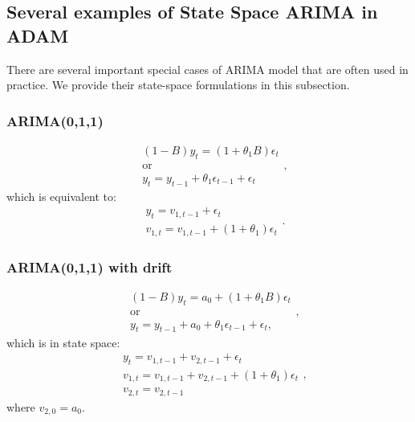\documentclass[]{book}
\theoremstyle{definition}
\theoremstyle{definition}
\theoremstyle{definition}
\theoremstyle{definition}
\theoremstyle{remark}
\begin{document}
\hypertarget{ADAMARIMAExamplesModels}{%
\subsection{Several examples of State Space ARIMA in ADAM}\label{ADAMARIMAExamplesModels}}

There are several important special cases of ARIMA model that are often used in practice. We provide their state-space formulations in this subsection.

\hypertarget{arima011}{%
\subsubsection{ARIMA(0,1,1)}\label{arima011}}

\begin{equation*}
    \begin{aligned}
        &(1-B) y_t = (1+\theta_1 B)\epsilon_t \\
        &\text{or} \\
        &y_{t} = y_{t-1} + \theta_1 \epsilon_{t-1} + \epsilon_t
    \end{aligned},
\end{equation*}
which is equivalent to:
\begin{equation}
  \begin{aligned}
    &{y}_{t} = v_{1,t-1} + \epsilon_t \\
    &v_{1,t} = v_{1,t-1} + (1 + \theta_1) \epsilon_{t}
  \end{aligned}.
  \label{eq:ADAMARIMAExpanded011}
\end{equation}

\hypertarget{arima011-with-drift}{%
\subsubsection{ARIMA(0,1,1) with drift}\label{arima011-with-drift}}

\begin{equation*}
    \begin{aligned}
        &(1-B) y_t = a_0 + (1+\theta_1 B) \epsilon_t \\
        &\text{or} \\
        &y_{t} = y_{t-1} + a_0 + \theta_1 \epsilon_{t-1} + \epsilon_t,
    \end{aligned},
\end{equation*}
which is in state space:
\begin{equation}
  \begin{aligned}
    &{y}_{t} = v_{1,t-1} + v_{2,t-1} + \epsilon_t \\
    &v_{1,t} = v_{1,t-1} + v_{2,t-1} + (1 + \theta_1) \epsilon_{t} \\
    &v_{2,t} = v_{2,t-1}
  \end{aligned},
  \label{eq:ADAMARIMAExpanded011}
\end{equation}
where \(v_{2,0}=a_0\).
\end{document}
